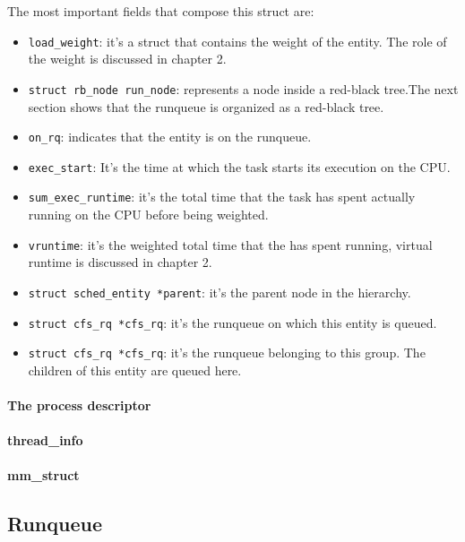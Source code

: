 \documentclass[10pt]{book}
\begin{document}
The most important fields that compose this struct are:
\begin{itemize}
    \item \verb|load_weight|: it's a struct that contains the weight of the entity. The role of the weight is discussed in chapter 2.
    \item \verb|struct rb_node run_node|: represents a node inside a red-black tree.The next section shows that the runqueue is organized as a red-black tree.
    \item \verb|on_rq|: indicates that the entity is on the runqueue.
    \item \verb|exec_start|: It's the time at which the task starts its execution on the CPU.
    \item \verb|sum_exec_runtime|: it's the total time that the task has spent actually running on the CPU before being weighted.
    \item \verb|vruntime|: it's the weighted total time that the has spent running, virtual runtime is discussed in chapter 2.
    \item \verb|struct sched_entity *parent|: it's the parent node in the hierarchy.
    \item \verb|struct cfs_rq *cfs_rq|: it's the runqueue on which this entity is queued.
    \item \verb|struct cfs_rq *cfs_rq|: it's the runqueue belonging to this group. The children of this entity are queued here.
\end{itemize}
\paragraph{The process descriptor}
\paragraph{thread\_info}
\paragraph{mm\_struct}

\subsection{Runqueue}

\end{document}
